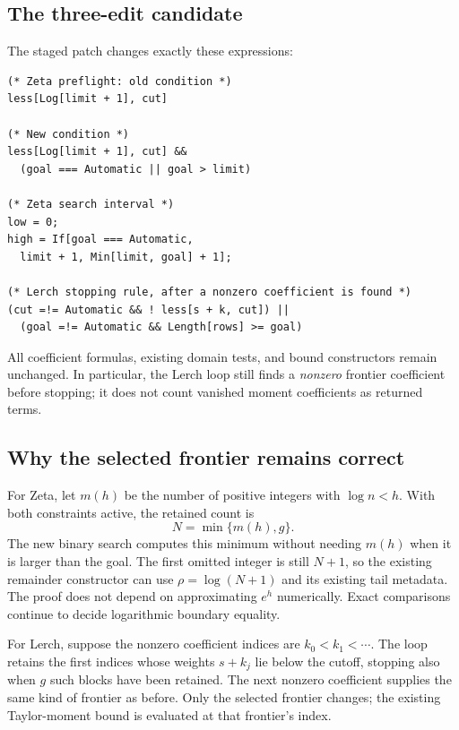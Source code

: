 \documentclass[11pt,letterpaper]{article}
\begin{document}
\subsection{The three-edit candidate}
The staged patch changes exactly these expressions:
\begin{lstlisting}
(* Zeta preflight: old condition *)
less[Log[limit + 1], cut]

(* New condition *)
less[Log[limit + 1], cut] &&
  (goal === Automatic || goal > limit)

(* Zeta search interval *)
low = 0;
high = If[goal === Automatic,
  limit + 1, Min[limit, goal] + 1];

(* Lerch stopping rule, after a nonzero coefficient is found *)
(cut =!= Automatic && ! less[s + k, cut]) ||
  (goal =!= Automatic && Length[rows] >= goal)
\end{lstlisting}
All coefficient formulas, existing domain tests, and bound constructors remain
unchanged. In particular, the Lerch loop still finds a \emph{nonzero} frontier
coefficient before stopping; it does not count vanished moment coefficients
as returned terms.

\subsection{Why the selected frontier remains correct}
For Zeta, let $m(h)$ be the number of positive integers with $\log n<h$.
With both constraints active, the retained count is
\begin{equation}
 N=\min\{m(h),g\}.
\end{equation}
The new binary search computes this minimum without needing $m(h)$ when it is
larger than the goal. The first omitted integer is still $N+1$, so the existing
remainder constructor can use $\rho=\log(N+1)$ and its existing tail metadata.
The proof does not depend on approximating $e^h$ numerically. Exact comparisons
continue to decide logarithmic boundary equality.

For Lerch, suppose the nonzero coefficient indices are
$k_0<k_1<\cdots$. The loop retains the first indices whose weights $s+k_j$ lie
below the cutoff, stopping also when $g$ such blocks have been retained. The
next nonzero coefficient supplies the same kind of frontier as before. Only
the selected frontier changes; the existing Taylor-moment bound is evaluated
at that frontier's index.
\end{document}
